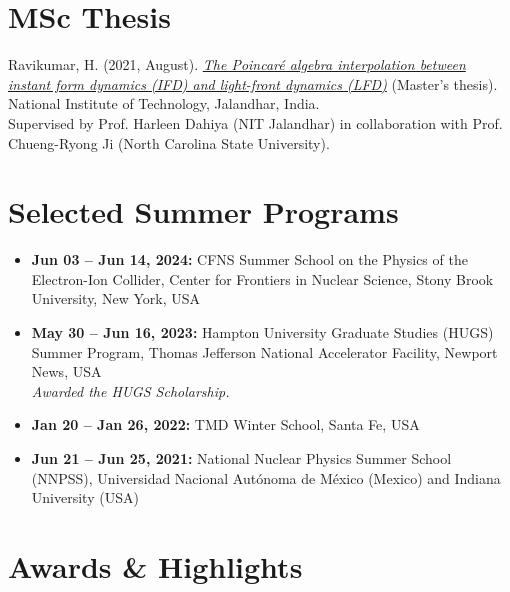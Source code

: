 \documentclass[11pt]{article}
\begin{document}
\section*{MSc Thesis}
\vspace{-0.3em}
Ravikumar, H. (2021, August). \href{https://hariprashad-ravikumar.github.io/publication_pdfs/The%20Poincare%CC%81%20Algebra%20Interpolation%20between%20Instant%20Form%20Dynamics%20(IFD)%20and%20Light%20Front%20Dynamics%20(LFD)%20(Master's%20thesis).pdf}{\textit{The Poincaré algebra interpolation between instant form dynamics (IFD) and light-front dynamics (LFD)}} (Master's thesis). National Institute of Technology, Jalandhar, India.  \\
Supervised by Prof. Harleen Dahiya (NIT Jalandhar) in collaboration with Prof. Chueng-Ryong Ji (North Carolina State University).

\section*{Selected Summer Programs}
\vspace{-0.3em}

\begin{itemize}
    \item \textbf{Jun 03 – Jun 14, 2024:} CFNS Summer School on the Physics of the Electron-Ion Collider, Center for Frontiers in Nuclear Science, Stony Brook University, New York, USA

    \item \textbf{May 30 – Jun 16, 2023:} Hampton University Graduate Studies (HUGS) Summer Program, Thomas Jefferson National Accelerator Facility, Newport News, USA \\
    \textit{Awarded the HUGS Scholarship.}

    \item \textbf{Jan 20 – Jan 26, 2022:} TMD Winter School, Santa Fe, USA

    \item \textbf{Jun 21 – Jun 25, 2021:} National Nuclear Physics Summer School (NNPSS), Universidad Nacional Autónoma de México (Mexico) and Indiana University (USA)
\end{itemize}

\section*{Awards \& Highlights}
\vspace{-0.3em}
\end{document}
